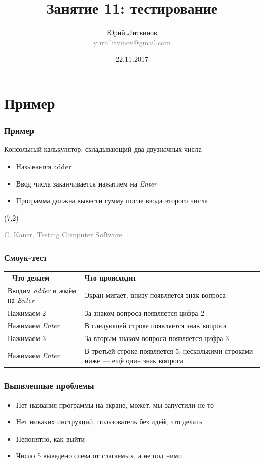 \documentclass[xetex,mathserif,serif]{beamer}
\title{Занятие 11: тестирование}
\author[Юрий Литвинов]{Юрий Литвинов\\\small{\textcolor{gray}{yurii.litvinov@gmail.com}}}
\date{22.11.2017}
\newcommand{\attribution}[1] {
	\begin{flushright}\begin{scriptsize}\textcolor{gray}{\textcopyright\; #1}\end{scriptsize}\end{flushright}
}
\begin{document}
	\frame{\titlepage}

	\section{Пример}

	\begin{frame}
		\frametitle{Пример}
		Консольный калькулятор, складывающий два двузначных числа
		\begin{itemize}
			\item Называется adder
			\item Ввод числа заканчивается нажатием на \textit{Enter}
			\item Программа должна вывести сумму после ввода второго числа
		\end{itemize}
		\begin{textblock}{5}(7,2)
			\attribution{C. Kaner, Testing Computer Software}
		\end{textblock}
	\end{frame}

	\begin{frame}
		\frametitle{Смоук-тест}
		\begin{center}
			\begin{tabu} {| X[0.6 l p] | X[1 l p] |}
				\tabucline-
				\everyrow{\tabucline-}
				\textbf{Что делаем}                             & \textbf{Что происходит}                                                            \\
				Вводим \textit{adder} и жмём на \textit{Enter}  & Экран мигает, внизу появляется знак вопроса                                        \\
				Нажимаем 2                                      & За знаком вопроса появляется цифра 2                                               \\
				Нажимаем \textit{Enter}                         & В следующей строке появляется знак вопроса                                         \\
				Нажимаем 3                                      & За вторым знаком вопроса появляется цифра 3                                        \\
				Нажимаем \textit{Enter}                         & В третьей строке появляется 5, несколькими строками ниже --- ещё один знак вопроса
			\end{tabu}
		\end{center}
	\end{frame}

	\begin{frame}
		\frametitle{Выявленные проблемы}
		\begin{itemize}
			\item Нет названия программы на экране, может, мы запустили не то
			\item Нет никаких инструкций, пользователь без идей, что делать
			\item Непонятно, как выйти
			\item Число 5 выведено слева от слагаемых, а не под ними
		\end{itemize}
	\end{frame}
\end{document}
